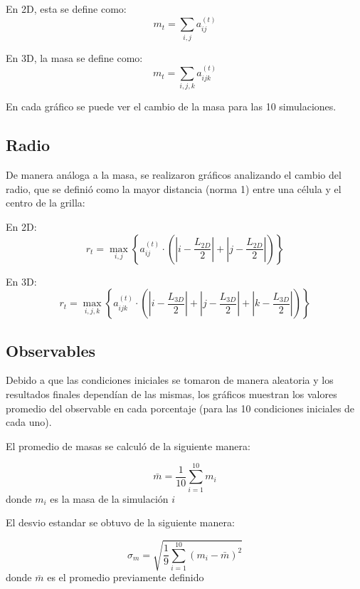 En 2D, esta se define como:
\begin{equation}
m_t = \sum_{i,j}{a^{(t)}_{ij}}
\end{equation}

En 3D, la masa se define como:
\begin{equation}
m_t = \sum_{i,j,k}{a^{(t)}_{ijk}}
\end{equation}

En cada gráfico se puede ver el cambio de la masa para las 10 simulaciones.

\subsection{Radio}
De manera análoga a la masa, se realizaron gráficos analizando el cambio del radio, que se definió como la mayor distancia (norma 1) entre una célula y el centro de la grilla:

En 2D:
\begin{equation}
r_t = \max_{i,j}{\left\{ a^{(t)}_{ij} \cdot \left( \left| i - \frac{L_{2D}}{2} \right| + \left| j - \frac{L_{2D}}{2} \right| \right) \right\}}
\end{equation}


En 3D:
\begin{equation}
r_t = \max_{i,j,k}{\left\{ a^{(t)}_{ijk} \cdot \left( \left| i - \frac{L_{3D}}{2} \right| + \left| j - \frac{L_{3D}}{2} \right| + \left| k - \frac{L_{3D}}{2} \right| \right) \right\}}
\end{equation}


\subsection{Observables}
Debido a que las condiciones iniciales se tomaron de manera aleatoria y los resultados finales dependían de las mismas, los gráficos muestran los valores promedio del observable en cada porcentaje (para las 10 condiciones iniciales de cada uno).

El promedio de masas se calculó de la siguiente manera:

\begin{equation}
    \label{eq:meanm}
    \bar{m} = \frac{1}{10} \sum_{i=1}^{10} m_i
\end{equation}
donde $m_i$ es la masa de la simulación $i$

El desvio estandar se obtuvo de la siguiente manera:

\begin{equation}
    \label{eq:stdm}
    \sigma_{m} = \sqrt{\frac{1}{9} \sum_{i=1}^{10} (m_i - \bar{m})^2}
\end{equation}
donde $\bar{m}$ es el promedio previamente definido

